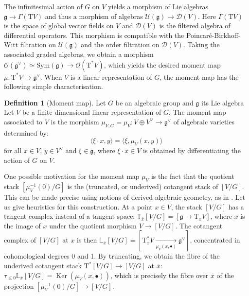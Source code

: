 \documentclass[11pt,english]{article}
\numberwithin{equation}{section}
\numberwithin{figure}{section}
\theoremstyle{definition}
\newtheorem{df}{Definition}[subsection]
\theoremstyle{plain}
\theoremstyle{remark}
\DeclareMathOperator{\Ker}{Ker}
\begin{document}
The infinitesimal action of $G$ on $V$ yields a morphism of Lie
algebras $\mathfrak{g}\rightarrow\Gamma(\mathrm{T}V)$ and thus a
morphism of algebras $\mathcal{U}(\mathfrak{g})\rightarrow\mathcal{D}(V)$.
Here $\Gamma(\mathrm{T}V)$ is the space of global vector fields on
$V$ and $\mathcal{D}(V)$ is the filtered algebra of differential
operators. This morphism is compatible with the Poincaré-Birkhoff-Witt
filtration on $\mathcal{U}(\mathfrak{g})$ and the order filtration
on $\mathcal{D}(V)$. Taking the associated graded algebras, we obtain
a morphism $\mathcal{O}(\mathfrak{g}^{\vee})\simeq\mathrm{Sym}(\mathfrak{g})\rightarrow\mathcal{O}(\mathrm{T}^{*}V)$,
which yields the desired moment map $\mu:\mathrm{T}^{*}V\rightarrow\mathfrak{g}^{\vee}$.
When $V$ is a linear representation of $G$, the moment map has the
following simple characterisation.

\begin{df}[Moment map]

Let $G$ be an algebraic group and $\mathfrak{g}$ its Lie algebra
Let $V$ be a finite-dimensional linear representation of $G$. The
moment map associated to $V$ is the morphism $\mu_{V,G}=\mu_{V}:V\oplus V^{\vee}\rightarrow\mathfrak{g}^{\vee}$
of algebraic varieties determined by:\[
\langle\xi\cdot x,y\rangle=\langle\xi,\mu_V(x,y)\rangle
\] for all $x\in V$, $y\in V^{\vee}$ and $\xi\in\mathfrak{g}$, where
$\xi\cdot x\in V$ is obtained by differentiating the action of $G$
on $V$.

\end{df}

One possible motivation for the moment map $\mu_{V}$ is the fact
that the quotient stack $\left[\mu_{V}^{-1}(0)/G\right]$ is the (truncated,
or underived) cotangent stack of $\left[V/G\right]$. This can be
made precise using notions of derived algebraic geometry, as in \cite[Exmp. 4.17.]{BCS20}.
Let us give heuristics for this construction. At a point $x\in V$,
the stack $\left[V/G\right]$ has a tangent complex instead of a tangent
space: $\mathbb{T}_{\overline{x}}[V/G]=\left[\mathfrak{g}\rightarrow\mathrm{T}_{x}V\right]$,
where $\overline{x}$ is the image of $x$ under the quotient morphism
$V\rightarrow\left[V/G\right]$. The cotangent complex of $\left[V/G\right]$
at $x$ is then $\mathbb{L}_{\overline{x}}[V/G]=\left[\mathrm{T}_{x}^{*}V\underset{\mu_{V}(x,\bullet)}{\longrightarrow}\mathfrak{g}^{\vee}\right]$,
concentrated in cohomological degrees 0 and 1. By truncating, we obtain
the fibre of the underived cotangent stack $\mathrm{T}^{*}[V/G]\rightarrow[V/G]$
at $\overline{x}$: $\tau_{\leq0}\mathbb{L}_{\overline{x}}[V/G]=\Ker(\mu_{V}(x,\bullet))$,
which is precisely the fibre over $\overline{x}$ of the projection
$\left[\mu_{V}^{-1}(0)/G\right]\rightarrow\left[V/G\right]$.
\end{document}
